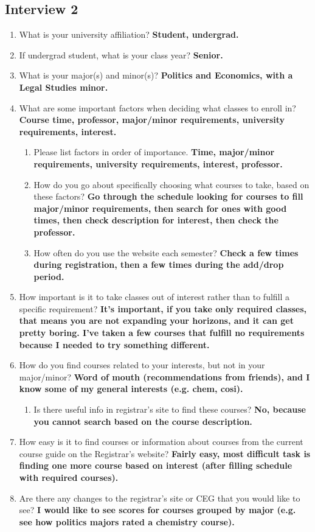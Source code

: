 \documentclass[12pt]{report}
\begin{document}
\subsection{Interview 2}

\begin{enumerate}
\item What is your university affiliation? \textbf{Student, undergrad.}
\item If undergrad student, what is your class year? \textbf{Senior.}
\item What is your major(s) and minor(s)? \textbf{Politics and Economics, with a Legal Studies minor.}
\item What are some important factors when deciding what classes to enroll in? \textbf{Course time, professor, major/minor requirements, university requirements, interest.}
	\begin{enumerate}
    \item Please list factors in order of importance. \textbf{Time, major/minor requirements, university requirements, interest, professor.}
    \item How do you go about specifically choosing what courses to take, based on these factors? \textbf{Go through the schedule looking for courses to fill major/minor requirements, then search for ones with good times, then check description for interest, then check the professor.}
   	\item How often do you use the website each semester? \textbf{Check a few times during registration, then a few times during the add/drop period.}
    \end{enumerate}
\item How important is it to take classes out of interest rather than to fulfill a specific requirement? \textbf{It's important, if you take only required classes, that means you are not expanding your horizons, and it can get pretty boring. I've taken a few courses that fulfill no requirements because I needed to try something different.}
\item How do you find courses related to your interests, but not in your major/minor? \textbf{Word of mouth (recommendations from friends), and I know some of my general interests (e.g. chem, cosi).}
	\begin{enumerate}
	\item Is there useful info in registrar's site to find these courses? \textbf{No, because you cannot search based on the course description.}
	\end{enumerate}
\item How easy is it to find courses or information about courses from the current course guide on the Registrar's website? \textbf{Fairly easy, most difficult task is finding one more course based on interest (after filling schedule with required courses).}
\item Are there any changes to the registrar's site or CEG that you would like to see? \textbf{I would like to see scores for courses grouped by major (e.g. see how politics majors rated a chemistry course).}
\end{enumerate}
\end{document}
